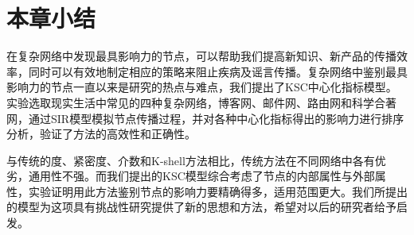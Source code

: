 \section{本章小结}
在复杂网络中发现最具影响力的节点，可以帮助我们提高新知识、新产品的传播效率，同时可以有效地制定相应的策略来阻止疾病及谣言传播。复杂网络中鉴别最具影响力的节点一直以来是研究的热点与难点，我们提出了KSC中心化指标模型。实验选取现实生活中常见的四种复杂网络，博客网、邮件网、路由网和科学合著网，通过SIR模型模拟节点传播过程，并对各种中心化指标得出的影响力进行排序分析，验证了方法的高效性和正确性。

与传统的度、紧密度、介数和K-shell方法相比，传统方法在不同网络中各有优劣，通用性不强。而我们提出的KSC模型综合考虑了节点的内部属性与外部属性，实验证明用此方法鉴别节点的影响力要精确得多，适用范围更大。我们所提出的模型为这项具有挑战性研究提供了新的思想和方法，希望对以后的研究者给予启发。